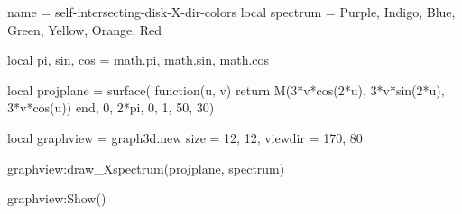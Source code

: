 \documentclass{standalone}
\begin{document}
\begin{luadraw}{name = self-intersecting-disk-X-dir-colors}
local spectrum = {Purple, Indigo, Blue, Green, Yellow, Orange, Red}

local pi, sin, cos = math.pi, math.sin, math.cos

local projplane = surface(
  function(u, v)
    return M(3*v*cos(2*u), 3*v*sin(2*u), 3*v*cos(u))
  end,
  0, 2*pi, 0, 1,
  {50, 30})

local graphview = graph3d:new{
  size    = {12, 12},
  viewdir = {170, 80}
}

graphview:draw_Xspectrum(projplane, spectrum)

graphview:Show()
\end{luadraw}
\end{document}
